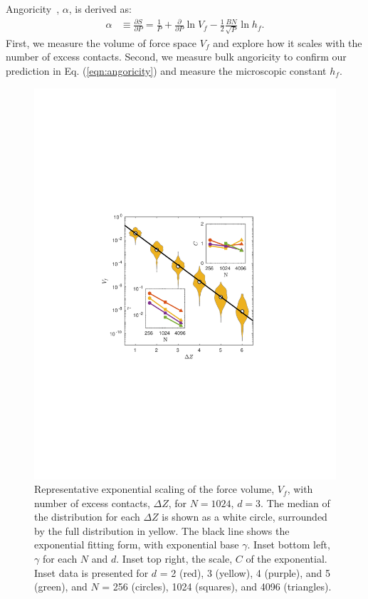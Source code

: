 Angoricity~\cite{edwards_distribution_2008}, $\alpha$, is derived as:
%
\begin{align}
\label{eqn:angoricity}
\alpha &\equiv \frac{\partial S}{\partial P} = \frac{1}{P}  + \frac{\partial }{\partial P}\ln{V_f} - \frac{1}{2} \frac{BN}{\sqrt{P}}\ln{h_f}.
\end{align}
%
First, we measure the volume of force space $V_f$ and explore how it scales with the number of excess contacts. Second, we measure bulk angoricity to confirm our prediction in Eq. (\ref{eqn:angoricity}) and measure the microscopic constant $h_f$.

\begin{figure}[t!]
\centering
\includegraphics[width=\columnwidth, trim=137 240 165 254, clip]{forceVolumeEntropyPaper/volumeInset.pdf}
\caption{Representative exponential scaling of the force volume, $V_f$, with number of excess contacts, $\Delta Z$, for $N=1024$, $d=3$. The median of the distribution for each $\Delta Z$ is shown as a white circle, surrounded by the full distribution in yellow. The black line shows the exponential fitting form, with exponential base $\gamma$. Inset bottom left, $\gamma$ for each $N$ and $d$. Inset top right, the scale, $C$ of the exponential. Inset data is presented for $d$ = 2 (red), 3 (yellow), 4 (purple), and 5 (green), and $N$ = 256 (circles), 1024 (squares), and 4096 (triangles).}
\label{volumePlot}
\end{figure}

